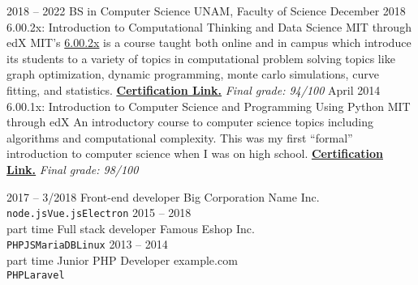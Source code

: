 \documentclass[9pt]{developercv}
\begin{document}
\begin{entrylist}
    \entry
        {2018 -- 2022}
        {BS in Computer Science}
        {UNAM, Faculty of Science}
        {}
    \entry
        {December 2018}
        {6.00.2x: Introduction to Computational Thinking and Data Science}
        {MIT through edX}
        {MIT's {\href{https://www.edx.org/course/introduction-to-computational-thinking-and-data-science-2}{6.00.2x}} is a course taught both online and in campus which introduce its students to a variety of topics in computational problem solving topics like graph optimization, dynamic programming, monte carlo simulations, curve fitting, and statistics. {\href{https://courses.edx.org/certificates/44a472b535354c15b494ac70b98af436}{\textbf{\underline{Certification Link.}}}} \textit{\small{Final grade: 94/100}}} 
    \entry
        {April 2014}
        {6.00.1x: Introduction to Computer Science and Programming Using Python}
        {MIT through edX}
        {An introductory course to computer science topics including algorithms and computational complexity. This was my first ``formal'' introduction to computer science when I was on high school. {\href{https://verify.edx.org/cert/7392793dde3e4537911d04e6ffc0b3f5}{\textbf{\underline{Certification Link.}}}} \textit{\small{Final grade: 98/100}}} 
\end{entrylist}





\begin{entrylist}
    \entry
        {2017 -- 3/2018}
        {Front-end developer}
        {Big Corporation Name Inc.}
        {\lorem \lorem \lorem\\ \texttt{node.js}\slashsep\texttt{Vue.js}\slashsep\texttt{Electron}}
    \entry
        {2015 -- 2018\\\footnotesize{part time}}
        {Full stack developer}
        {Famous Eshop Inc.}
        {\lorem\lorem\\ \texttt{PHP}\slashsep\texttt{JS}\slashsep\texttt{MariaDB}\slashsep\texttt{Linux}}
    \entry
        {2013 -- 2014\\\footnotesize{part time}}
        {Junior PHP Developer}
        {example.com}
        {\lorem\lorem\\ \texttt{PHP}\slashsep\texttt{Laravel}}
\end{entrylist}
\end{document}
